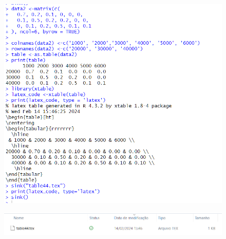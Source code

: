 \documentclass{article}
\begin{document}
\begin{figure}[H]
    \centering
    \includegraphics[width=1\linewidth]{imagesfolder/image27.png}
\end{figure}
\begin{figure}[H]
    \centering
    \includegraphics[width=1\linewidth]{imagesfolder/image29.png}
\end{figure}
\end{document}
